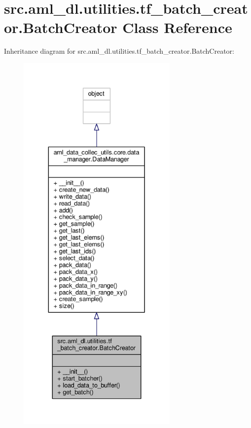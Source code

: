 \hypertarget{classsrc_1_1aml__dl_1_1utilities_1_1tf__batch__creator_1_1_batch_creator}{\section{src.\-aml\-\_\-dl.\-utilities.\-tf\-\_\-batch\-\_\-creator.\-Batch\-Creator Class Reference}
\label{classsrc_1_1aml__dl_1_1utilities_1_1tf__batch__creator_1_1_batch_creator}
}


Inheritance diagram for src.\-aml\-\_\-dl.\-utilities.\-tf\-\_\-batch\-\_\-creator.\-Batch\-Creator\-:\nopagebreak
\begin{figure}[H]
\begin{center}
\leavevmode
\includegraphics[height=550pt]{classsrc_1_1aml__dl_1_1utilities_1_1tf__batch__creator_1_1_batch_creator__inherit__graph}
\end{center}
\end{figure}


